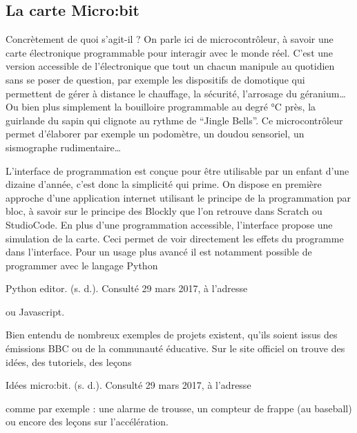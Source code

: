 \documentclass[letterpaper,10pt,french]{sphinxmanual}
\begin{document}
\subsection{La carte Micro:bit}
\label{\detokenize{decouverte/05_generalite:la-carte-micro-bit}}

Concrètement de quoi s’agit-il ? On parle ici de
microcontrôleur, à savoir une carte électronique
programmable pour interagir avec le monde réel.
C’est une version accessible de l’électronique que
tout un chacun manipule au quotidien sans se poser
de question, par exemple les dispositifs de domotique
qui permettent de gérer à distance le chauffage,
la sécurité, l’arrosage du géranium…
Ou bien plus simplement la bouilloire programmable
au degré °C près, la guirlande du sapin qui
clignote au rythme de “Jingle Bells”.
Ce microcontrôleur permet d’élaborer par exemple
un podomètre, un doudou sensoriel, un sismographe
rudimentaire…


L’interface de programmation est conçue pour être
utilisable par un enfant d’une dizaine d’année, c’est
donc la simplicité qui prime. On dispose en première
approche d’une application internet utilisant le
principe de la programmation par bloc, à savoir sur
le principe des Blockly que l’on retrouve dans Scratch
ou StudioCode. En plus d’une programmation accessible,
l’interface propose une simulation de la carte.
Ceci permet de voir directement les effets du programme
dans l’interface. Pour un usage plus avancé il est
notamment possible de programmer avec le langage
Python %
\begin{footnote}[7]\sphinxAtStartFootnote
Python editor. (s. d.). Consulté 29 mars 2017,
à l’adresse 
%
\end{footnote} ou Javascript.


Bien entendu de nombreux exemples de projets existent,
qu’ils soient issus des émissions BBC ou de la
communauté éducative. Sur le site officiel on
trouve des idées, des tutoriels, des leçons %
\begin{footnote}[8]\sphinxAtStartFootnote
Idées \textbar{} micro:bit. (s. d.). Consulté 29 mars
2017, à l’adresse 
%
\end{footnote}
comme par exemple : une alarme de trousse, un
compteur de frappe (au baseball) ou encore des
leçons sur l’accélération.
\end{document}
